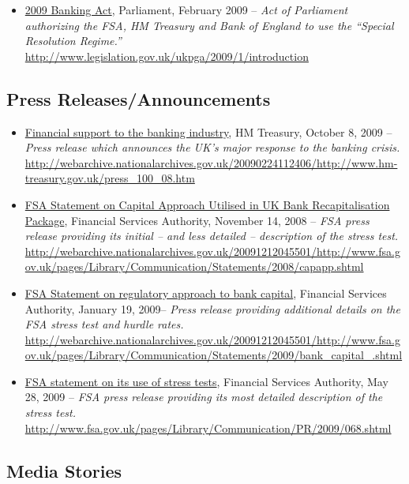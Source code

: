 \documentclass[12pt]{article}
\begin{document}
\begin{itemize}
\item
\ul{2009 Banking Act}, Parliament, February 2009 -- \emph{Act of Parliament authorizing the FSA, HM Treasury and Bank of England to use the ``Special Resolution Regime.''} \url{http://www.legislation.gov.uk/ukpga/2009/1/introduction}
\end{itemize}

\subsection{Press Releases/Announcements}

\begin{itemize}
\item
\ul{Financial support to the banking industry}, HM Treasury, October 8, 2009 -- \emph{Press release which
 announces the UK's major response to the banking crisis.} \url{http://webarchive.nationalarchives.gov.uk/20090224112406/http://www.hm-treasury.gov.uk/press_100_08.htm}
\item
\ul{FSA Statement on Capital Approach Utilised in UK Bank Recapitalisation Package}, Financial Services Authority, November 14, 2008 -- \emph{FSA press release providing its initial -- and less detailed -- description of the stress test.} \url{http://webarchive.nationalarchives.gov.uk/20091212045501/http://www.fsa.gov.uk/pages/Library/Communication/Statements/2008/capapp.shtml}
\item
\ul{FSA Statement on regulatory approach to bank capital}, Financial Services Authority, January 19, 2009-- \emph{Press release
 providing additional details on the FSA stress test and hurdle rates.} \url{http://webarchive.nationalarchives.gov.uk/20091212045501/http://www.fsa.gov.uk/pages/Library/Communication/Statements/2009/bank_capital_.shtml}
\item
\ul{FSA statement on its use of stress tests}, Financial Services Authority, May 28, 2009 -- \emph{FSA press release providing its most detailed description of the stress test.} \url{http://www.fsa.gov.uk/pages/Library/Communication/PR/2009/068.shtml}
\end{itemize}

\subsection{Media Stories}
\end{document}
